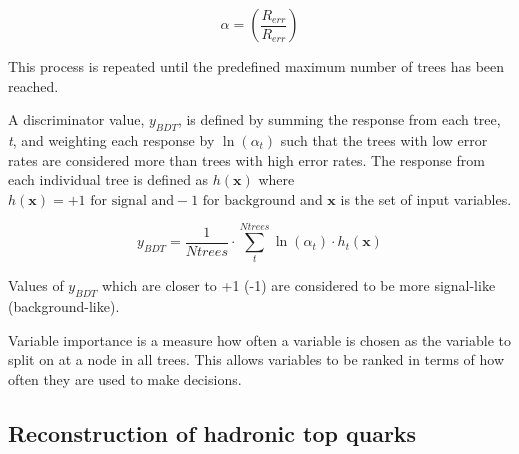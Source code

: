 \begin{equation}
\alpha = \left( \frac{R_{err}}{R_{err}}  \right)
\label{eqn:ErrorWeight}
\end{equation}

This process is repeated until the predefined maximum number of trees has been reached. 

A discriminator value, $y_{BDT}$, is defined by summing the response from each tree, \emph{t}, and weighting each response by $\ln \left(\alpha_{t}\right)$ such that the trees with low error rates are considered more than trees with high error rates. The response from each individual tree is defined as $h\left(\textbf{x}\right)$ where $h\left(\textbf{x}\right) = +1 \textrm{ for signal and} -1 \textrm{ for background}$ and $\textbf{x}$ is the set of input variables. 

\begin{equation}
y_{BDT} = \frac{1}{Ntrees} \cdot \sum_{t}^{Ntrees} \ln \left(\alpha_{t}\right) \cdot h_{t}\left(\textbf{x}\right)
\end{equation}

Values of $y_{BDT}$ which are closer to +1 (-1) are considered to be more signal-like (background-like).

Variable importance is a measure how often a variable is chosen as the variable to split on at a node in all trees. This allows variables to be ranked in terms of how often they are used to make decisions.

\subsection{Reconstruction of hadronic top quarks \label{sec:topreco}}


